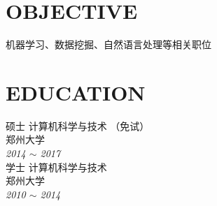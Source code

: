\documentclass[line, margin]{res}
\begin{document}
\address{likun@stu.zzu.edu.cn}
\address{152-2511-1797}

\begin{resume}
\vspace {5pt}
\section{OBJECTIVE}
 { 机器学习、数据挖掘、自然语言处理等相关职位}

\section{EDUCATION} 
 { 硕士 计算机科学与技术 （免试）  \\
 郑州大学 }\\
 {\sl 2014 $\sim$ 2017} \\
[10pt]
 { 学士 计算机科学与技术 \\
 郑州大学 } \\
 {\sl 2010 $\sim$ 2014 }


\end{resume}
\end{document}
